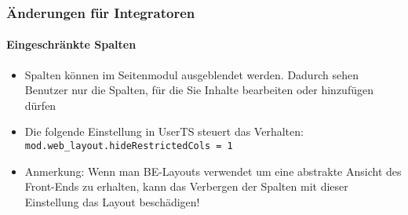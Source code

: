 
\begin{frame}[fragile]
	\frametitle{Änderungen für Integratoren}
	\framesubtitle{Eingeschränkte Spalten}

	\begin{itemize}
		\item Spalten können im Seitenmodul ausgeblendet werden. Dadurch sehen 
			Benutzer nur die Spalten, für die Sie Inhalte bearbeiten oder hinzufügen dürfen

		\item Die folgende Einstellung in UserTS steuert das Verhalten:\newline
			\small
				\texttt{mod.web\_layout.hideRestrictedCols = 1}
			\normalsize

		\item Anmerkung: Wenn man BE-Layouts verwendet um eine abstrakte Ansicht des Front-Ends zu erhalten,
			kann das Verbergen der Spalten mit dieser Einstellung das Layout beschädigen!

	\end{itemize}

\end{frame}


